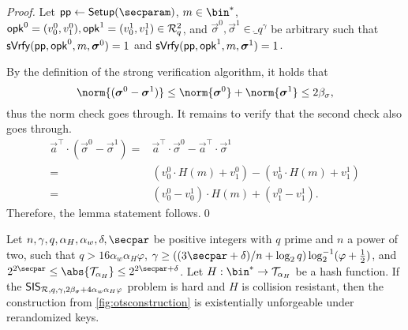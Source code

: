 \begin{proof}
  Let $\params\gets\setup(\secparam)$, $m\in\bin^*$, $\mathsf{opk}^0=(v^0_0,v^0_1),\mathsf{opk}^1=(v^1_0,v^1_1)\in \mathcal{R}^2_q$, and $\vec{\sigma}^0,\vec{\sigma}^1 \in \ring_q^\gamma$ be arbitrary such that $\mathsf{sVrfy}(\mathsf{pp},\mathsf{opk}^0,m,\boldsymbol{\sigma}^0)=1$ and $\mathsf{sVrfy}(\mathsf{pp},\mathsf{opk}^1,m,\boldsymbol{\sigma}^1)=1$.
  
  By the definition of the strong verification algorithm, it holds that
  \begin{equation*}
     \norm{(\vec{\sigma}^0-\vec{\sigma}^1)}
    \leq \norm{\vec{\sigma}^0}+\norm{\vec{\sigma}^1}
    \leq 2\beta_\sigma,
  \end{equation*}
  thus the norm check goes through.
  It remains to verify that the second check also goes through.
  \begin{align*}
     \vec{a}^\intercal\cdot (\vec{\sigma}^0-\vec{\sigma}^1)
    ={}& \vec{a}^\intercal\cdot \vec{\sigma}^0- \vec{a}^\intercal\cdot\vec{\sigma}^1\\
    ={}& (v^0_0\cdot H(m) + v^0_1) - (v^1_0\cdot H(m) + v^1_1)\tag{Def of $\sverify$}\\
    ={}& (v^0_0-v^1_0)\cdot H(m) + (v^0_1-v^1_1).
  \end{align*}
  Therefore, the lemma statement follows.\qed
\end{proof}


\begin{lemma}\label{lem:kots_sis}
  Let $n,\gamma,q,\alpha_H,\alpha_w,\delta,\secpar$ be positive integers with $q$ prime and $n$ a power of two, such that $q > 16 \alpha_w \alpha_H\varphi$, $\gamma\geq((3\secpar+\delta)/n+\log_2q)\log^{-1}_2(\varphi+\tfrac{1}{2})$, and $2^{2\secpar} \leq \abs{\tern_{\alpha_H}} \leq 2^{2\secpar + \delta}$.
  Let $H : \bin^* \to \tern_{\alpha_H}$ be a hash function.
  If the $\mathsf{SIS}_{\mathcal{R},q,\gamma,2\beta_\sigma + 4\alpha_w\alpha_H\varphi}$ problem is hard and $H$ is collision resistant, then the construction from \autoref{fig:otsconstruction} is existentially unforgeable under rerandomized keys.
\end{lemma}

